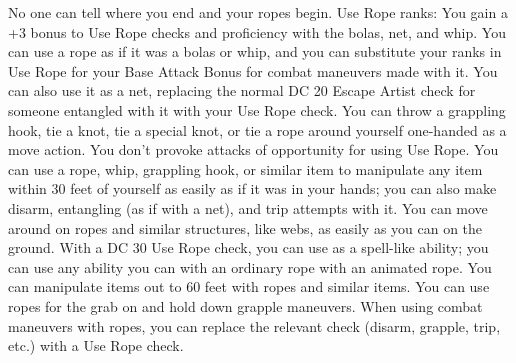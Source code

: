 \skillfeat
{No one can tell where you end and your ropes begin.}
{Use Rope ranks:}
{You gain a +3 bonus to Use Rope checks and proficiency with the bolas, net, and whip.}
{You can use a rope as if it was a bolas or whip, and you can substitute your ranks in Use Rope for your Base Attack Bonus for combat maneuvers made with it. You can also use it as a net, replacing the normal DC 20 Escape Artist check for someone entangled with it with your Use Rope check. You can throw a grappling hook, tie a knot, tie a special knot, or tie a rope around yourself one-handed as a move action. You don't provoke attacks of opportunity for using Use Rope.}
{You can use a rope, whip, grappling hook, or similar item to manipulate any item within 30 feet of yourself as easily as if it was in your hands; you can also make disarm, entangling (as if with a net), and trip attempts with it. You can move around on ropes and similar structures, like webs, as easily as you can on the ground.}
{With a DC 30 Use Rope check, you can use  as a spell-like ability; you can use any ability you can with an ordinary rope with an animated rope.}
{You can manipulate items out to 60 feet with ropes and similar items. You can use ropes for the grab on and hold down grapple maneuvers. When using combat maneuvers with ropes, you can replace the relevant check (disarm, grapple, trip, etc.) with a Use Rope check.}